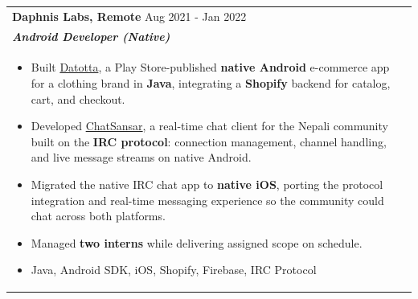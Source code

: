 \documentclass[a4paper,8pt]{article}
\begin{document}
\begin{tabularx}{\linewidth}{ @{}l r@{} }
\color[HTML]{1C033C} \textbf{Daphnis Labs, Remote} \hfill \color[HTML]{371e77} Aug 2021 - Jan 2022 \\[4pt]
\color[HTML]{371e77}\textbf{\textit{Android Developer (Native)}}\ \hfill \color[HTML]{4B28A4} \\[5pt]
\begin{minipage}[t]{\linewidth}
    \begin{itemize}[nosep,after=\strut, leftmargin=2em, itemsep=2pt]
        \item Built \href{https://play.google.com/store/apps/details?id=com.datotta}{Datotta}, a Play Store-published \textbf{native Android} e-commerce app for a clothing brand in \textbf{Java}, integrating a \textbf{Shopify} backend for catalog, cart, and checkout.
        \item Developed \href{https://play.google.com/store/apps/details?id=com.chatsansar.android}{ChatSansar}, a real-time chat client for the Nepali community built on the \textbf{IRC protocol}: connection management, channel handling, and live message streams on native Android.
        \item Migrated the native IRC chat app to \textbf{native iOS}, porting the protocol integration and real-time messaging experience so the community could chat across both platforms.
        \item Managed \textbf{two interns} while delivering assigned scope on schedule.
        \item Java, Android SDK, iOS, Shopify, Firebase, IRC Protocol
    \end{itemize}
    \end{minipage}
\end{tabularx}\\[3pt]
\end{document}
